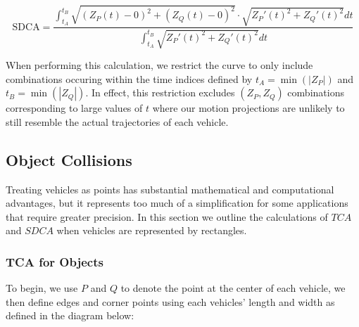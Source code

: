 \documentclass{article}
\begin{document}
\begin{equation}
    \text{SDCA} = \frac{\int_{t_A}^{t_B} \sqrt{(Z_P(t) - 0)^2 + (Z_Q(t) - 0)^2} \cdot \sqrt{Z_P'(t)^2 + Z_Q'(t)^2} dt}{\int_{t_A}^{t_B} \sqrt{Z_P'(t)^2 + Z_Q'(t)^2} dt}
    \label{eqsdca}
\end{equation}

When performing this calculation, we restrict the curve to only include combinations occuring within the time indices defined by $t_A = \min(|Z_P|)$ and $t_B = \min(|Z_Q|)$.  In effect, this restriction excludes $(Z_P, Z_Q)$ combinations corresponding to large values of $t$ where our motion projections are unlikely to still resemble the actual trajectories of each vehicle.

\subsection{Object Collisions}

Treating vehicles as points has substantial mathematical and computational advantages, but it represents too much of a simplification for some applications that require greater precision.  In this section we outline the calculations of $TCA$ and $SDCA$ when vehicles are represented by rectangles. 

\subsubsection{TCA for Objects}

To begin, we use $P$ and $Q$ to denote the point at the center of each vehicle, we then define edges and corner points using each vehicles' length and width as defined in the diagram below:
\end{document}
